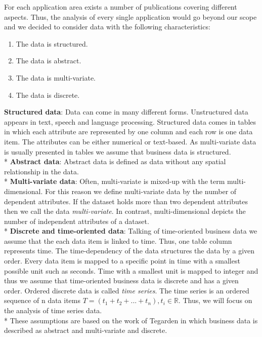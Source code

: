 For each application area exists a number of publications covering different aspects. Thus, the analysis of every single application would go beyond our scope and we decided to consider data with the following characteristics: 
\begin{enumerate}
    \item The data is structured. 
    \item The data is abstract.
    \item The data is multi-variate.
    \item The data is discrete.
\end{enumerate}
\textbf{Structured data}: Data can come in many different forms. Unstructured data appears in text, speech and language processing\cite{Borgo2013}. Structured data comes in tables in which each attribute are represented by one column and each row is one data item. The attributes can be either numerical or text-based. As multi-variate data is usually presented in tables\cite{Borgo2013} we assume that business data is structured.\\*
\textbf{Abstract data}: Abstract data is defined as data without any spatial relationship in the data\cite{Shneiderman1996}. \\*
\textbf{Multi-variate data}: 
Often, multi-variate is mixed-up with the term multi-dimensional. For this reason we define  multi-variate data by the number of dependent attributes. If the dataset holds more than two dependent attributes then we call the data \textit{multi-variate}. In contrast, multi-dimensional depicts the number of independent attributes of a dataset\cite{Aigner2011}.  \\*
\textbf{Discrete and time-oriented data}: Talking of time-oriented business data we assume that the each data item is linked to time. Thus, one table column represents time. The time-dependency of the data structures the data by a given order. Every data item is mapped to a specific point in time with a smallest possible unit such as seconds. Time with a smallest unit is mapped to integer\cite{Aigner2011} and thus we assume that time-oriented business data is discrete and has a given order. Ordered discrete data is called \textit{time series}. The time series is an ordered sequence of n data items $T=(t_1+t_2+...+t_n),t_i\in\mathbb{R}$. Thus, we will focus on the analysis of time series data. \\*
These assumptions are based on the work of Tegarden in which business data is described as abstract and multi-variate and discrete\cite{Tegarden1999}.
